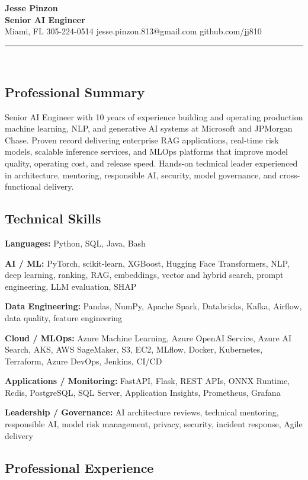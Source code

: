 \documentclass[10pt]{article}
\makeatletter
\newcommand{\resumesubtitle}{Senior AI Engineer}
\newcommand{\resumecontact}{Miami, FL \textbar{} 305-224-0514 \textbar{}
jesse.pinzon.813@gmail.com \textbar{} github.com/jj810}
\renewcommand{\maketitle}{%
  \begin{center}
    {\fontsize{23.5}{27}\bfseries\color{ResumeName} Jesse
Pinzon}\\[0.15em]
    {\fontsize{12.5}{15}\bfseries\color{ResumeSubtitle} \resumesubtitle}\\[0.25em]
    {\fontsize{10.5}{13}\color{ResumeContact} \resumecontact}\\[0.35em]
    \rule{\textwidth}{0.4pt}\\[0.5em]
  \end{center}
}
\makeatother
\begin{document}
\maketitle

\subsection{Professional Summary}\label{professional-summary}

Senior AI Engineer with 10 years of experience building and operating
production machine learning, NLP, and generative AI systems at Microsoft
and JPMorgan Chase. Proven record delivering enterprise RAG
applications, real-time risk models, scalable inference services, and
MLOps platforms that improve model quality, operating cost, and release
speed. Hands-on technical leader experienced in architecture, mentoring,
responsible AI, security, model governance, and cross-functional
delivery.

\subsection{Technical Skills}\label{technical-skills}

\textbf{Languages:} Python, SQL, Java, Bash

\textbf{AI / ML:} PyTorch, scikit-learn, XGBoost, Hugging Face
Transformers, NLP, deep learning, ranking, RAG, embeddings, vector and
hybrid search, prompt engineering, LLM evaluation, SHAP

\textbf{Data Engineering:} Pandas, NumPy, Apache Spark, Databricks,
Kafka, Airflow, data quality, feature engineering

\textbf{Cloud / MLOps:} Azure Machine Learning, Azure OpenAI Service,
Azure AI Search, AKS, AWS SageMaker, S3, EC2, MLflow, Docker,
Kubernetes, Terraform, Azure DevOps, Jenkins, CI/CD

\textbf{Applications / Monitoring:} FastAPI, Flask, REST APIs, ONNX
Runtime, Redis, PostgreSQL, SQL Server, Application Insights,
Prometheus, Grafana

\textbf{Leadership / Governance:} AI architecture reviews, technical
mentoring, responsible AI, model risk management, privacy, security,
incident response, Agile delivery

\subsection{Professional Experience}\label{professional-experience}
\end{document}

